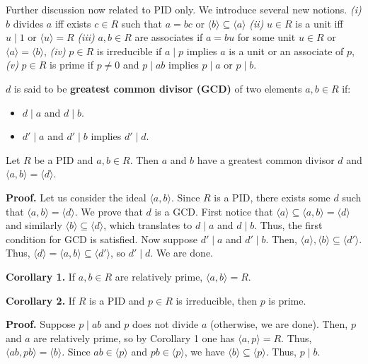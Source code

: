 \documentclass{template}
\begin{document}
Further discussion now related to PID only. We introduce several new notions.
\textit{(i)} $b$ divides $a$ iff exists $c \in R$ such that $a=bc$ or $\langle b
\rangle \subseteq \langle a \rangle$ \textit{(ii)} $u \in R$ is a unit iff $u
\mid 1$ or $\langle u \rangle = R$ \textit{(iii)} $a,b \in R$ are associates if
$a=bu$ for some unit $u \in R$ or $\langle a \rangle = \langle b \rangle$,
\textit{(iv)} $p \in R$ is irreducible if $a \mid p$ implies $a$ is a unit or an
associate of $p$, \textit{(v)} $p \in R$ is prime if $p \neq 0$ and $p \mid ab$
implies $p \mid a$ or $p \mid b$.

\begin{definition}
    $d$ is said to be \textbf{greatest common divisor (GCD)} of two 
    elements $a,b \in R$ if:
    \begin{itemize}
        \item[\textit{(a)}] $d \mid a$ and $d \mid b$.
        \item[\textit{(b)}] $d' \mid a$ and $d' \mid b$ implies $d' \mid d$.
    \end{itemize}
\end{definition}

\begin{proposition}
    Let $R$ be a PID and $a,b \in R$. Then $a$ and $b$ have a greatest 
    common divisor $d$ and $\langle a,b \rangle = \langle d \rangle$.
\end{proposition}

\textbf{Proof.} Let us consider the ideal $\langle a,b \rangle$. Since $R$ is a
PID, there exists some $d$ such that $\langle a,b \rangle = \langle d \rangle$.
We prove that $d$ is a GCD. First notice that $\langle a \rangle \subseteq
\langle a,b \rangle = \langle d \rangle$ and similarly $\langle b \rangle
\subseteq \langle d \rangle$, which translates to $d \mid a$ and $d \mid b$.
Thus, the first condition for GCD is satisfied. Now suppose $d' \mid a$ and $d'
\mid b$. Then, $\langle a \rangle, \langle b \rangle \subseteq \langle
d'\rangle$. Thus, $\langle d \rangle = \langle a, b \rangle \subseteq \langle d'
\rangle$, so $d' \mid d$. We are done.

\textbf{Corollary 1.} If $a,b \in R$ are relatively prime, $\langle a,b \rangle
= R$.

\textbf{Corollary 2.} If $R$ is a PID and $p \in R$ is irreducible, then $p$ is
prime.

\textbf{Proof.} Suppose $p \mid ab$ and $p$ does not divide $a$ (otherwise, we
are done). Then, $p$ and $a$ are relatively prime, so by Corollary 1 one has
$\langle a, p \rangle = R$. Thus, $\langle ab, pb \rangle = \langle b \rangle$.
Since $ab \in \langle p \rangle$ and $pb \in \langle p \rangle$, we have
$\langle b \rangle \subseteq \langle p \rangle$. Thus, $p \mid b$.
\end{document}
